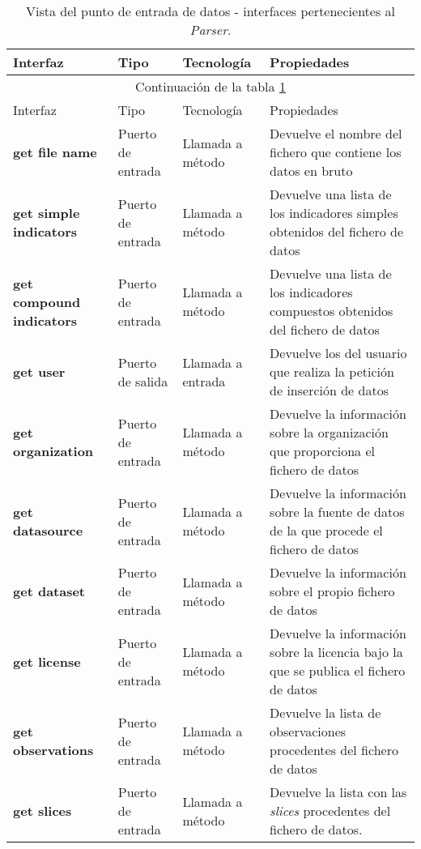 \begin{longtable}[c]{|p{25mm}|p{20mm}|p{30mm}|p{60mm}|}
 \caption{Vista del punto de entrada de datos - interfaces pertenecientes al \textit{Parser}.\label{interfaces_receiver_parser}}\\
 \hline
 	Interfaz & Tipo & Tecnología & Propiedades\\
 \hline
 \hline
 \endfirsthead
 \hline
 \multicolumn{4}{|c|}{Continuación de la tabla \ref{interfaces_receiver_parser}}\\
 \hline
 	Interfaz & Tipo & Tecnología & Propiedades\\
 \hline
 \hline
 \endhead
 \hline
 \endfoot
 	
 	\textbf{get file name} & Puerto de entrada & Llamada a método & Devuelve el nombre del fichero que contiene los datos en bruto \\
 	\hline
 	
 	\textbf{get simple indicators} & Puerto de entrada & Llamada a método & Devuelve una lista de los indicadores simples obtenidos del fichero de datos \\
 	\hline
 	
 	\textbf{get compound indicators} & Puerto de entrada & Llamada a método & Devuelve una lista de los indicadores compuestos obtenidos del fichero de datos \\
 	\hline
 	
  	\textbf{get user} & Puerto de salida & Llamada a entrada & Devuelve los del usuario que realiza la petición de inserción de datos \\
  	\hline
  	
  	\textbf{get organization} & Puerto de entrada & Llamada a método & Devuelve la información sobre la organización que proporciona el fichero de datos \\
  	\hline
  	
   	\textbf{get datasource} & Puerto de entrada & Llamada a método & Devuelve la información sobre la fuente de datos de la que procede el fichero de datos \\
   	\hline
   	
   	\textbf{get dataset} & Puerto de entrada & Llamada a método & Devuelve la información sobre el propio fichero de datos\\
   	\hline
   	
   	\textbf{get license} & Puerto de entrada & Llamada a método & Devuelve la información sobre la licencia bajo la que se publica el fichero de datos \\
   	\hline
   	
   	\textbf{get observations} & Puerto de entrada & Llamada a método & Devuelve la lista de observaciones procedentes del fichero de datos \\
   	\hline
   	
   	\textbf{get slices} & Puerto de entrada & Llamada a método & Devuelve la lista con las \textit{slices} procedentes del fichero de datos. \\
   	\hline
\hline
\hline
 
\end{longtable}



